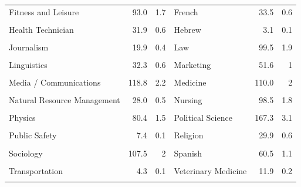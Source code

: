 \documentclass[
  12pt,
]{article}
\begin{document}
\begin{table}[!h]
\begin{tabular}[t]{lrrlrr}
Fitness and Leisure & 93.0 & 1.7 & French & 33.5 & 0.6\\
\cellcolor{gray!10}{Geography} & \cellcolor{gray!10}{43.3} & \cellcolor{gray!10}{0.8} & \cellcolor{gray!10}{German} & \cellcolor{gray!10}{42.2} & \cellcolor{gray!10}{0.8}\\
Health Technician & 31.9 & 0.6 & Hebrew & 3.1 & 0.1\\
\cellcolor{gray!10}{History} & \cellcolor{gray!10}{227.4} & \cellcolor{gray!10}{4.2} & \cellcolor{gray!10}{Japanese} & \cellcolor{gray!10}{10.7} & \cellcolor{gray!10}{0.2}\\
Journalism & 19.9 & 0.4 & Law & 99.5 & 1.9\\
\cellcolor{gray!10}{Liberal Arts} & \cellcolor{gray!10}{16.7} & \cellcolor{gray!10}{0.3} & \cellcolor{gray!10}{Library Science} & \cellcolor{gray!10}{25.0} & \cellcolor{gray!10}{0.5}\\
Linguistics & 32.3 & 0.6 & Marketing & 51.6 & 1\\
\cellcolor{gray!10}{Mathematics} & \cellcolor{gray!10}{406.2} & \cellcolor{gray!10}{7.6} & \cellcolor{gray!10}{Mechanic / Repair Tech} & \cellcolor{gray!10}{23.4} & \cellcolor{gray!10}{0.4}\\
Media / Communications & 118.8 & 2.2 & Medicine & 110.0 & 2\\
\cellcolor{gray!10}{Military Science} & \cellcolor{gray!10}{2.9} & \cellcolor{gray!10}{0.1} & \cellcolor{gray!10}{Music} & \cellcolor{gray!10}{101.2} & \cellcolor{gray!10}{1.9}\\
Natural Resource Management & 28.0 & 0.5 & Nursing & 98.5 & 1.8\\
\cellcolor{gray!10}{Nutrition} & \cellcolor{gray!10}{19.6} & \cellcolor{gray!10}{0.4} & \cellcolor{gray!10}{Philosophy} & \cellcolor{gray!10}{70.8} & \cellcolor{gray!10}{1.3}\\
Physics & 80.4 & 1.5 & Political Science & 167.3 & 3.1\\
\cellcolor{gray!10}{Psychology} & \cellcolor{gray!10}{222.7} & \cellcolor{gray!10}{4.1} & \cellcolor{gray!10}{Public Administration} & \cellcolor{gray!10}{7.8} & \cellcolor{gray!10}{0.1}\\
Public Safety & 7.4 & 0.1 & Religion & 29.9 & 0.6\\
\cellcolor{gray!10}{Sign Language} & \cellcolor{gray!10}{6.9} & \cellcolor{gray!10}{0.1} & \cellcolor{gray!10}{Social Work} & \cellcolor{gray!10}{48.8} & \cellcolor{gray!10}{0.9}\\
Sociology & 107.5 & 2 & Spanish & 60.5 & 1.1\\
\cellcolor{gray!10}{Theatre Arts} & \cellcolor{gray!10}{36.3} & \cellcolor{gray!10}{0.7} & \cellcolor{gray!10}{Theology} & \cellcolor{gray!10}{36.9} & \cellcolor{gray!10}{0.7}\\
Transportation & 4.3 & 0.1 & Veterinary Medicine & 11.9 & 0.2\\
\cellcolor{gray!10}{Women's Studies} & \cellcolor{gray!10}{7.4} & \cellcolor{gray!10}{0.1} & \cellcolor{gray!10}{} & \cellcolor{gray!10}{} & \cellcolor{gray!10}{}\\
\bottomrule
\end{tabular}
\end{table}
\end{document}
